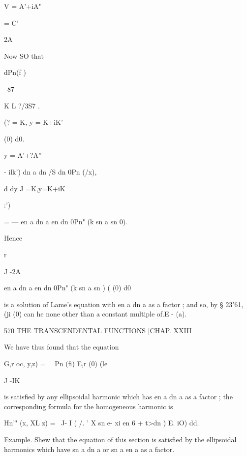 {{{{{{{{V = A'+iA"



= C'



2A



Now SO that



dPn(f )

\ 87 \



K L ?/3S7 .



(? = K, y = K+iK'



(0) d0.



y = A'+?A''



- ilk') dn a dn /S dn 0Pn (/x),



d dy J =K,y=K+iK



:')



= — en a dn a en dn 0Pn" (k sn a sn 0).



Hence



r

J -2A



en a dn a en dn 0Pn" (k sn a sn ) ( (0) d0



is a solution of Lame's equation with en a dn a as a factor ; and so,
by § 23'61, (ji (0) can he none other than a constant multiple of.E -
(a).



570 THE TRANSCENDENTAL FUNCTIONS [CHAP. XXIII

We have thus found that the equation

G,r oc, y,z) = \ \ Pn (fi) E,r (0) (le

J -IK

is satisfied by any ellipsoidal harmonic which has en a dn a as a
factor ; the corresponding formula for the homogeneous harmonic is

Hn'" (x, XL z) = \ J- I ( /. ' X sn e- xi en 6 + t>dn ) E. iO) dd.

Example. Shew that the equation of this section is satisfied by the
ellipsoidal harmonics which have sn a dn a or sn a en a as a factor.

}}}}}}}}

